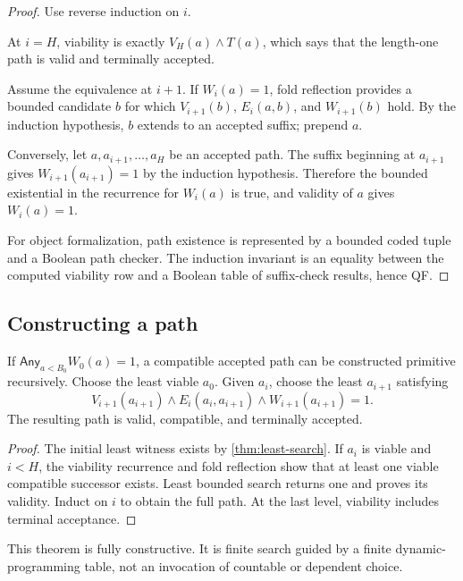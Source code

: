 \begin{proof}
Use reverse induction on \(i\).

At \(i=H\), viability is exactly \(V_H(a)\wedge T(a)\), which says that the length-one path is valid and terminally accepted.

Assume the equivalence at \(i+1\).  If \(W_i(a)=1\), fold reflection provides a bounded candidate \(b\) for which \(V_{i+1}(b)\), \(E_i(a,b)\), and \(W_{i+1}(b)\) hold.  By the induction hypothesis, \(b\) extends to an accepted suffix; prepend \(a\).

Conversely, let \(a,a_{i+1},\ldots,a_H\) be an accepted path.  The suffix beginning at \(a_{i+1}\) gives \(W_{i+1}(a_{i+1})=1\) by the induction hypothesis.  Therefore the bounded existential in the recurrence for \(W_i(a)\) is true, and validity of \(a\) gives \(W_i(a)=1\).

For object formalization, path existence is represented by a bounded coded tuple and a Boolean path checker.  The induction invariant is an equality between the computed viability row and a Boolean table of suffix-check results, hence QF.
\end{proof}

\subsection{Constructing a path}

\begin{theorem}\label{thm:finite-choice}
If \(\mathsf{Any}_{a<B_0}W_0(a)=1\), a compatible accepted path can be constructed primitive recursively.  Choose the least viable \(a_0\).  Given \(a_i\), choose the least \(a_{i+1}\) satisfying
\[
 V_{i+1}(a_{i+1})\wedge E_i(a_i,a_{i+1})\wedge W_{i+1}(a_{i+1})=1.
\]
The resulting path is valid, compatible, and terminally accepted.
\end{theorem}

\begin{proof}
The initial least witness exists by \cref{thm:least-search}.  If \(a_i\) is viable and \(i<H\), the viability recurrence and fold reflection show that at least one viable compatible successor exists.  Least bounded search returns one and proves its validity.  Induct on \(i\) to obtain the full path.  At the last level, viability includes terminal acceptance.
\end{proof}

This theorem is fully constructive.  It is finite search guided by a finite dynamic-programming table, not an invocation of countable or dependent choice.

